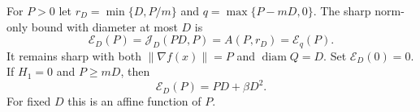 \begin{corollary}
\label{jointdiam:norm}
For $P>0$ let $r_D=\min\{D,P/m\}$ and $q=\max\{P-mD,0\}$. The
sharp norm-only bound with diameter at most $D$ is
\begin{equation}\label{jointdiam:norm-formula}
 \mathcal E_D(P)=\mathcal J_D(PD,P)
       =A(P,r_D)=\mathcal E_q(P).
\end{equation}
It remains sharp with both $\|\nabla f(x)\|=P$ and
$\operatorname{diam}Q=D$. Set $\mathcal E_D(0)=0$.
If $H_1=0$ and $P\ge mD$, then
\begin{equation}\label{jointdiam:norm-constant}
 \mathcal E_D(P)=PD+\beta D^2.
\end{equation}
For fixed $D$ this is an affine function of $P$.
\end{corollary}
